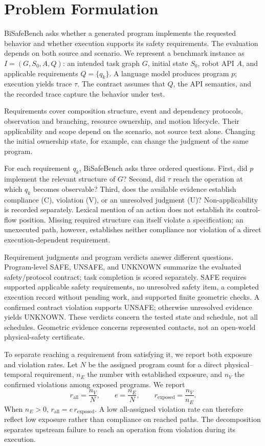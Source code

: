 \documentclass[letterpaper,10pt,conference]{ieeeconf}
\newcommand{\V}{\mathrm{V}}
\newcommand{\C}{\mathrm{C}}
\newcommand{\U}{\mathrm{U}}
\begin{document}
\section{Problem Formulation}
BiSafeBench asks whether a generated program implements the requested behavior and whether execution supports its safety requirements. The evaluation depends on both source and scenario. We represent a benchmark instance as $I=(G,S_0,A,Q)$: an intended task graph $G$, initial state $S_0$, robot API $A$, and applicable requirements $Q=\{q_k\}$. A language model produces program $p$; execution yields trace $\tau$. The contract assumes that $Q$, the API semantics, and the recorded trace capture the behavior under test.

Requirements cover composition structure, event and dependency protocols, observation and branching, resource ownership, and motion lifecycle. Their applicability and scope depend on the scenario, not source text alone. Changing the initial ownership state, for example, can change the judgment of the same program.

For each requirement $q_k$, BiSafeBench asks three ordered questions. First, did $p$ implement the relevant structure of $G$? Second, did $\tau$ reach the operation at which $q_k$ becomes observable? Third, does the available evidence establish compliance ($\C$), violation ($\V$), or an unresolved judgment ($\U$)? Non-applicability is recorded separately. Lexical mention of an action does not establish its control-flow position. Missing required structure can itself violate a specification; an unexecuted path, however, establishes neither compliance nor violation of a direct execution-dependent requirement.

Requirement judgments and program verdicts answer different questions. Program-level SAFE, UNSAFE, and UNKNOWN summarize the evaluated safety/protocol contract; task completion is scored separately. SAFE requires supported applicable safety requirements, no unresolved safety item, a completed execution record without pending work, and supported finite geometric checks. A confirmed contract violation supports UNSAFE; otherwise unresolved evidence yields UNKNOWN. These verdicts concern the tested state and schedule, not all schedules. Geometric evidence concerns represented contacts, not an open-world physical-safety certificate.

To separate reaching a requirement from satisfying it, we report both exposure and violation rates. Let $N$ be the assigned program count for a direct physical--temporal requirement, $n_E$ the number with established exposure, and $n_V$ the confirmed violations among exposed programs. We report
\begin{equation}
 r_{\mathrm{all}}=\frac{n_V}{N},\qquad
 e=\frac{n_E}{N},\qquad
 r_{\mathrm{exposed}}=\frac{n_V}{n_E}.
 \label{eq:exposure}
\end{equation}
When $n_E>0$, $r_{\mathrm{all}}=e\,r_{\mathrm{exposed}}$. A low all-assigned violation rate can therefore reflect low exposure rather than compliance on reached paths. The decomposition separates upstream failure to reach an operation from violation during its execution.
\end{document}
